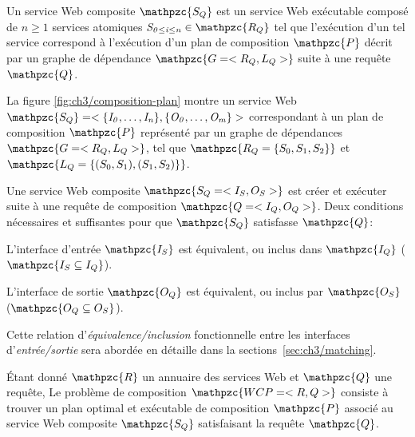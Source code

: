 \begin{mydef}
  Un service Web composite $\mathpzc{S_Q}$ est un service Web
  exécutable composé de $n \geq 1$ services atomiques
  $\mathit{S_{0 \leq i \leq n}} \in \mathpzc{R_Q}$ tel que l'exécution
  d'un tel service correspond à l'exécution d'un plan de composition
  $\mathpzc{P}$ décrit par un graphe de dépendance
  $\mathpzc{G = <R_Q,L_Q>}$ suite à une requête $\mathpzc{Q}$.\medskip
\end{mydef}

La figure \ref{fig:ch3/composition-plan} montre un service Web
$\mathpzc{S_Q} = <\mathit{\{I_0, \dots, I_n\}}, \mathit{\{O_0, \dots,
  O_m\}}>$
correspondant à un plan de composition $\mathpzc{P}$ représenté par un
graphe de dépendances $\mathpzc{G =<R_Q,L_Q>}$, tel que
$\mathpzc{R_Q = \{S_0, S_1, S_2\}}$ et
$\mathpzc{L_Q = \{(S_0, S_1), (S_1, S_2)\}}$.\medskip

Une service Web composite $\mathpzc{S_Q = <I_S, O_S>}$ est créer et
exécuter suite à une requête de composition $\mathpzc{Q=<I_Q, O_Q>}$.
Deux conditions nécessaires et suffisantes pour que $\mathpzc{S_Q}$
satisfasse $\mathpzc{Q}$:\medskip

\begin{enumerateRoman}
\item L'interface d'entrée $\mathpzc{I_S}$ est équivalent, ou inclus
  dans $\mathpzc{I_Q}$ ($\mathpzc{I_S \subseteq I_Q}$).

\item L'interface de sortie $\mathpzc{O_Q}$ est équivalent, ou inclus
  par $\mathpzc{O_S}$ ($\mathpzc{O_Q \subseteq O_S}$).\medskip
\end{enumerateRoman}
\enddescription

Cette relation d'\emph{équivalence/inclusion} fonctionnelle entre les
interfaces d'\emph{entrée/sortie} sera abordée en détaille dans la
sections~\ref{sec:ch3/matching}.\medskip

\begin{mydef}
  Étant donné $\mathpzc{R}$ un annuaire des services Web et
  $\mathpzc{Q}$ une requête, Le problème de composition
  $\mathpzc{WCP=<R,Q>}$ consiste à trouver un plan optimal et
  exécutable de composition $\mathpzc{P}$ associé au service Web
  composite $\mathpzc{S_Q}$ satisfaisant la requête
  $\mathpzc{Q}$.\medskip
\end{mydef}



